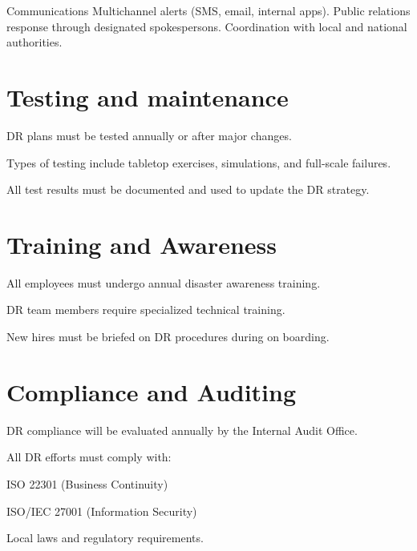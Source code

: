 Communications
    Multichannel alerts (SMS, email, internal apps).
    Public relations response through designated spokespersons.
    Coordination with local and national authorities.
\section{Testing and maintenance}

DR plans must be tested annually or after major changes.

Types of testing include tabletop exercises, simulations, and full-scale failures.

All test results must be documented and used to update the DR strategy.

\section{Training and Awareness}

All employees must undergo annual disaster awareness training.

DR team members require specialized technical training.

New hires must be briefed on DR procedures during on boarding.
\section{Compliance and Auditing}

DR compliance will be evaluated annually by the Internal Audit Office.

All DR efforts must comply with:

ISO 22301 (Business Continuity)

ISO/IEC 27001 (Information Security)

Local laws and regulatory requirements.